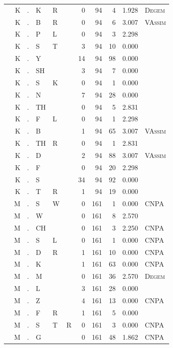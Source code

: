 \documentclass[12pt]{article}
\begin{document}
\begin{longtable}{r@{ } r@{ } c@{ } l@{ } l@{ } l@{ } r r r r l }
 & K & . & K & R &  & 0 & 94 & 4 & 1.928 & \textsc{Degem} \\
 & K & . & B & R &  & 0 & 94 & 6 & 3.007 & \textsc{VAssim} \\
 & K & . & P & L &  & 0 & 94 & 3 & 2.298 &  \\
 & K & . & S & T &  & 3 & 94 & 10 & 0.000 &  \\
 & K & . & Y &  &  & 14 & 94 & 98 & 0.000 &  \\
 & K & . & SH &  &  & 3 & 94 & 7 & 0.000 &  \\
 & K & . & S & K &  & 0 & 94 & 1 & 0.000 &  \\
 & K & . & N &  &  & 7 & 94 & 28 & 0.000 &  \\
 & K & . & TH &  &  & 0 & 94 & 5 & 2.831 &  \\
 & K & . & F & L &  & 0 & 94 & 1 & 2.298 &  \\
 & K & . & B &  &  & 1 & 94 & 65 & 3.007 & \textsc{VAssim} \\
 & K & . & TH & R &  & 0 & 94 & 1 & 2.831 &  \\
 & K & . & D &  &  & 2 & 94 & 88 & 3.007 & \textsc{VAssim} \\
 & K & . & F &  &  & 0 & 94 & 20 & 2.298 &  \\
 & K & . & S &  &  & 34 & 94 & 92 & 0.000 &  \\
 & K & . & T & R &  & 1 & 94 & 19 & 0.000 &  \\
 & M & . & S & W &  & 0 & 161 & 1 & 0.000 & \textsc{CNPA} \\
 & M & . & W &  &  & 0 & 161 & 8 & 2.570 &  \\
 & M & . & CH &  &  & 0 & 161 & 3 & 2.250 & \textsc{CNPA} \\
 & M & . & S & L &  & 0 & 161 & 1 & 0.000 & \textsc{CNPA} \\
 & M & . & D & R &  & 1 & 161 & 10 & 0.000 & \textsc{CNPA} \\
 & M & . & K &  &  & 1 & 161 & 63 & 0.000 & \textsc{CNPA} \\
 & M & . & M &  &  & 0 & 161 & 36 & 2.570 & \textsc{Degem} \\
 & M & . & L &  &  & 3 & 161 & 28 & 0.000 &  \\
 & M & . & Z &  &  & 4 & 161 & 13 & 0.000 & \textsc{CNPA} \\
 & M & . & F & R &  & 1 & 161 & 5 & 0.000 &  \\
 & M & . & S & T & R & 0 & 161 & 3 & 0.000 & \textsc{CNPA} \\
 & M & . & G &  &  & 0 & 161 & 48 & 1.862 & \textsc{CNPA} \\

\end{longtable}
\end{document}
